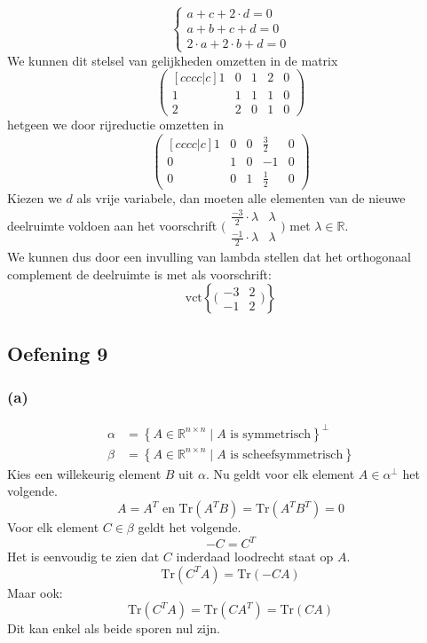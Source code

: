 \documentclass[lineaire_algebra_oplossingen.tex]{subfiles}
\begin{document}
\[
\left\{
\begin{array}{l}
a+c+2 \cdot d=0\\
a+b+c+d=0\\
2 \cdot a+2 \cdot b+d=0
\end{array} \right.
\]
We kunnen dit stelsel van gelijkheden omzetten in de matrix
\[
\begin{pmatrix}[cccc|c]
1 & 0 & 1 & 2 & 0\\
1 & 1 & 1 & 1 & 0\\
2 & 2 & 0 & 1 & 0
\end{pmatrix}
\]
hetgeen we door rijreductie omzetten in
\[
\begin{pmatrix}[cccc|c]
1 & 0 & 0 & \frac{3}{2} & 0\\
0 & 1 & 0 & -1 & 0\\
0 & 0 & 1 & \frac{1}{2} & 0
\end{pmatrix}
\]
Kiezen we $d$ als vrije variabele, dan moeten alle elementen van de nieuwe deelruimte voldoen aan het voorschrift $\bigl(\begin{smallmatrix}
\frac{-3}{2} \cdot \lambda & \lambda \\
\frac{-1}{2} \cdot \lambda & \lambda
\end{smallmatrix}\bigr)$ met $\lambda \in \mathbb{R}$.\\
We kunnen dus door een invulling van lambda stellen dat het orthogonaal complement de deelruimte is met als voorschrift:
\[
\text{vct}\left\{\bigl(\begin{smallmatrix}
-3 & 2 \\
-1 & 2
\end{smallmatrix}\bigr)\right\}
\]

\subsection{Oefening 9}
\subsubsection*{(a)}
\begin{align*}
\alpha &=
\left\{
A \in \mathbb{R}^{n\times n} \mid A \text{ is symmetrisch}
\right\}^\bot \\
\beta &=
\left\{
A \in \mathbb{R}^{n\times n} \mid A \text{ is scheefsymmetrisch}
\right\}
\end{align*}
Kies een willekeurig element $B$ uit $\alpha$. Nu geldt voor elk element $A\in\alpha^\bot$ het volgende.
\[
A=A^T\text{ en } \text{Tr}(A^TB) = \text{Tr}(A^TB^T)= 0
\]
Voor elk element $C \in \beta$ geldt het volgende.
\[
-C = C^T
\]
Het is eenvoudig te zien dat $C$ inderdaad loodrecht staat op $A$.
\[
\text{Tr}(C^TA) = \text{Tr}(-CA)
\]
Maar ook:
\[
\text{Tr}(C^TA) = \text{Tr}(CA^T) = \text{Tr}(CA)
\]
Dit kan enkel als beide sporen nul zijn.
\end{document}

